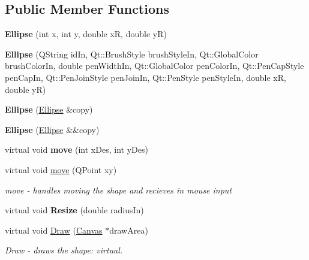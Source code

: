\subsection*{Public Member Functions}
\begin{DoxyCompactItemize}
\item 
\mbox{\label{class_ellipse_aeb485faf04752402afb7269c04d8c9fc}} 
{\bfseries Ellipse} (int x, int y, double xR, double yR)
\item 
\mbox{\label{class_ellipse_a0024e8c9f0a3b7dcba13dd463313552b}} 
{\bfseries Ellipse} (Q\+String id\+In, Qt\+::\+Brush\+Style brush\+Style\+In, Qt\+::\+Global\+Color brush\+Color\+In, double pen\+Width\+In, Qt\+::\+Global\+Color pen\+Color\+In, Qt\+::\+Pen\+Cap\+Style pen\+Cap\+In, Qt\+::\+Pen\+Join\+Style pen\+Join\+In, Qt\+::\+Pen\+Style pen\+Style\+In, double xR, double yR)
\item 
\mbox{\label{class_ellipse_a68d1db1ff440a5390c3d2b961095fc90}} 
{\bfseries Ellipse} (\hyperlink{class_ellipse}{Ellipse} \&copy)
\item 
\mbox{\label{class_ellipse_a02e36e6e3dc5d7aed93945a960b7a261}} 
{\bfseries Ellipse} (\hyperlink{class_ellipse}{Ellipse} \&\&copy)
\item 
\mbox{\label{class_ellipse_a951f44f301984fac6364ef2746d796c6}} 
virtual void {\bfseries move} (int x\+Des, int y\+Des)
\item 
virtual void \hyperlink{class_ellipse_a8f5c5a4d8051009fee6d861f163c96dd}{move} (Q\+Point xy)
\begin{DoxyCompactList}\small\item\em move -\/ handles moving the shape and recieves in mouse input \end{DoxyCompactList}\item 
\mbox{\label{class_ellipse_add1d1c291306985bcbf7cffbebcf4514}} 
virtual void {\bfseries Resize} (double radius\+In)
\item 
virtual void \hyperlink{class_ellipse_aaf9524151dc799501327f72c75e0f010}{Draw} (\hyperlink{class_canvas}{Canvas} $\ast$draw\+Area)
\begin{DoxyCompactList}\small\item\em Draw -\/ draws the shape\+: virtual. \end{DoxyCompactList}\item 

\end{DoxyCompactItemize}
